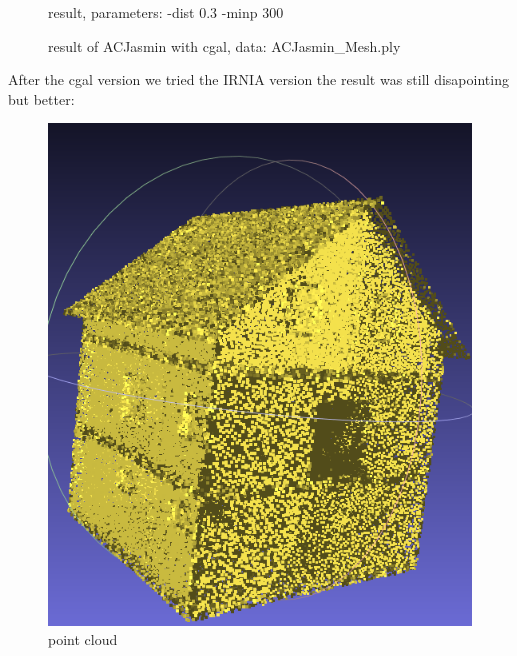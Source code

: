 \documentclass{article}
\begin{document}
\begin{figure}[H]
\begin{minipage}[t]{0.27\textwidth}
    \caption*{result,
    \newline parameters: -dist 0.3 \newline-minp 300}
  \end{minipage}
  \caption{result of ACJasmin with cgal, data: ACJasmin\_Mesh.ply}
\end{figure}  

After the cgal version we tried the IRNIA version the result was still disapointing but better: 
\vspace{\baselineskip}
\begin{figure}[H]
  \centering
  \begin{minipage}[t]{0.29\textwidth}
    \includegraphics[width=\textwidth]{../../images/screen_kinetic/ACJasmin_point_cloud.png}
    \caption*{point cloud}
  \end{minipage}
  \begin{minipage}[t]{0.29\textwidth}

\end{minipage}
\end{figure}
\end{document}
